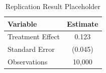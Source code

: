 
\begin{table}[h]
\centering
\caption{Replication Result Placeholder}
\begin{tabular}{lc}
\toprule
Variable & Estimate \\
\midrule
Treatment Effect & 0.123 \\
Standard Error & (0.045) \\
Observations & 10,000 \\
\bottomrule
\end{tabular}
\end{table}
